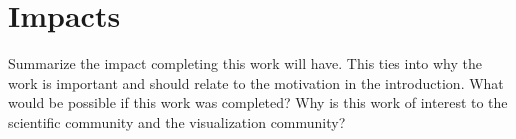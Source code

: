\section{Impacts}
\label{sec:impact}

Summarize the impact completing this work will have. This ties into why the
work is important and should relate to the motivation in the introduction.
What would be possible if this work was completed? Why is this work of
interest to the scientific community and the visualization community?
